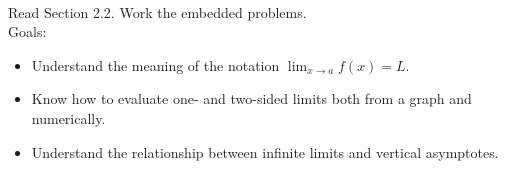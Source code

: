 \documentclass[11pt,fleqn]{article}
\begin{document}
\renewcommand{\headrulewidth}{0pt}
\newcommand{\blank}[1]{\rule{#1}{0.75pt}}
\newcommand{\bc}{\begin{center}}
\newcommand{\ec}{\end{center}}
\renewcommand{\d}{\displaystyle}

\vspace*{-0.7in}

\begin{center}
  \LARGE
  \\
\end{center}
Read Section 2.2. Work the embedded problems. \\
Goals: \\
\begin{itemize}
	\item Understand the meaning of the notation $\d \lim_{x \to a} f(x)=L$.
	\item Know how to evaluate one- and two-sided limits both from a graph and numerically.
	\item Understand the relationship between infinite limits and vertical asymptotes.
\end{itemize}
\end{document}

